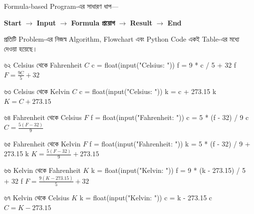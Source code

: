 \begin{rememberbox}

Formula-based Program-এর সাধারণ ধাপ—

\begin{center}

\textbf{Start}
\(\rightarrow\)
\textbf{Input}
\(\rightarrow\)
\textbf{Formula প্রয়োগ}
\(\rightarrow\)
\textbf{Result}
\(\rightarrow\)
\textbf{End}

\end{center}

প্রতিটি Problem-এর নিজস্ব Algorithm, Flowchart এবং Python Code
একই Table-এর মধ্যে দেওয়া হয়েছে।

\end{rememberbox}


\formulaexercise
{৬২}
{Celsius থেকে Fahrenheit}
{\(C\)}
{c = float(input("Celsius: "))}
{f = 9 * c / 5 + 32}
{f}
{\(F=\frac{9C}{5}+32\)}


\formulaexercise
{৬৩}
{Celsius থেকে Kelvin}
{\(C\)}
{c = float(input("Celsius: "))}
{k = c + 273.15}
{k}
{\(K=C+273.15\)}


\formulaexercise
{৬৪}
{Fahrenheit থেকে Celsius}
{\(F\)}
{f = float(input("Fahrenheit: "))}
{c = 5 * (f - 32) / 9}
{c}
{\(C=\frac{5(F-32)}{9}\)}


\formulaexercise
{৬৫}
{Fahrenheit থেকে Kelvin}
{\(F\)}
{f = float(input("Fahrenheit: "))}
{k = 5 * (f - 32) / 9 + 273.15}
{k}
{\(K=\frac{5(F-32)}{9}+273.15\)}


\formulaexercise
{৬৬}
{Kelvin থেকে Fahrenheit}
{\(K\)}
{k = float(input("Kelvin: "))}
{f = 9 * (k - 273.15) / 5 + 32}
{f}
{\(F=\frac{9(K-273.15)}{5}+32\)}


\formulaexercise
{৬৭}
{Kelvin থেকে Celsius}
{\(K\)}
{k = float(input("Kelvin: "))}
{c = k - 273.15}
{c}
{\(C=K-273.15\)}

